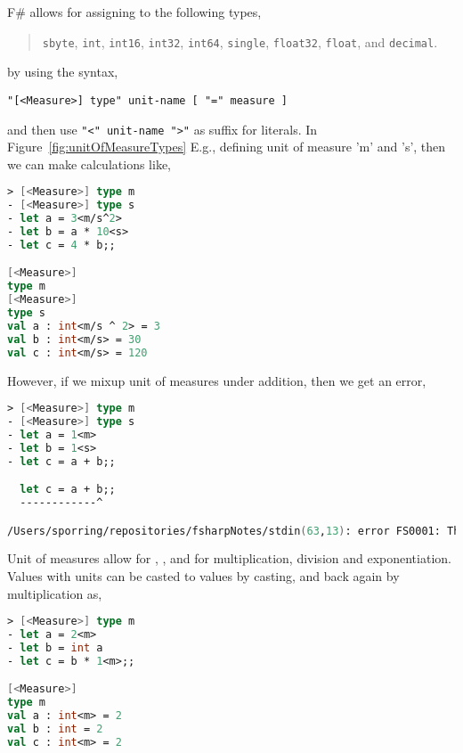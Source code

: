 F\# allows for assigning  to the following types,
\begin{quote}
  \mbox{\lstinline{sbyte},}
  \mbox{\lstinline{int},}
  \mbox{\lstinline{int16},}
  \mbox{\lstinline{int32},}
  \mbox{\lstinline{int64},}
  \mbox{\lstinline{single},}
  \mbox{\lstinline{float32},}
  \mbox{\lstinline{float},} and
  \mbox{\lstinline{decimal}.}
\end{quote}
by using the syntax,
%
\begin{lstlisting}[language=EBNF]
"[<Measure>] type" unit-name [ "=" measure ]
\end{lstlisting}
%
and then use \lstinline[language=EBNF]|"<" unit-name ">"| as suffix for literals. In Figure~\ref{fig:unitOfMeasureTypes}
E.g., defining unit of measure 'm' and 's', then we can make calculations like,
%
\begin{lstlisting}[language=fsharp,caption={fsharpi, floating point and integer numbers may be assigned unit of measures.}]
> [<Measure>] type m
- [<Measure>] type s 
- let a = 3<m/s^2>
- let b = a * 10<s>
- let c = 4 * b;;

[<Measure>]
type m
[<Measure>]
type s
val a : int<m/s ^ 2> = 3
val b : int<m/s> = 30
val c : int<m/s> = 120
\end{lstlisting}
However, if we mixup unit of measures under addition, then we get an error,
%
\begin{lstlisting}[language=fsharp,caption={fsharpi, unit of measures adds an extra layer of types for syntax checking at compile time.}]
> [<Measure>] type m 
- [<Measure>] type s 
- let a = 1<m>
- let b = 1<s>
- let c = a + b;;

  let c = a + b;;
  ------------^

/Users/sporring/repositories/fsharpNotes/stdin(63,13): error FS0001: The unit of measure 's' does not match the unit of measure 'm'
\end{lstlisting}
Unit of measures allow for \token{*}, \token{/}, and \token{^} for multiplication, division and exponentiation. Values with units can be casted to  values by casting, and back again by multiplication as,
%
\begin{lstlisting}[language=fsharp,caption={fsharpi, type casting unit of measures.}]
> [<Measure>] type m      
- let a = 2<m>            
- let b = int a           
- let c = b * 1<m>;;

[<Measure>]
type m
val a : int<m> = 2
val b : int = 2
val c : int<m> = 2
\end{lstlisting}
